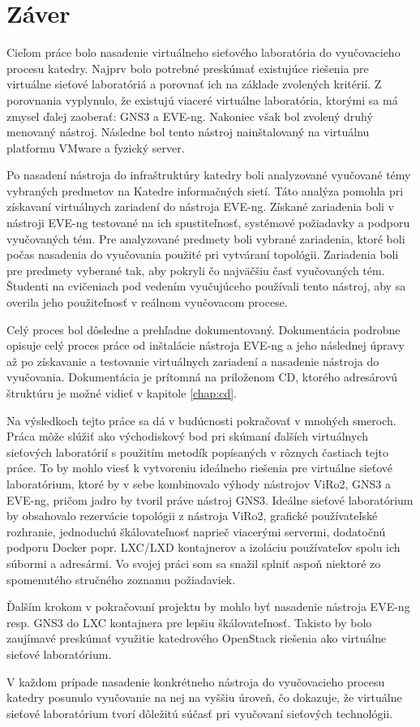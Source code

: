 \chapter{Záver}

Cieľom práce bolo nasadenie virtuálneho sieťového laboratória do vyučovacieho procesu katedry. Najprv bolo potrebné preskúmať existujúce riešenia pre virtuálne sieťové laboratóriá a porovnať ich na základe zvolených kritérií. Z porovnania vyplynulo, že existujú viaceré virtuálne laboratória, ktorými sa má zmysel ďalej zaoberať: GNS3 a EVE-ng. Nakoniec však bol zvolený druhý menovaný nástroj. Následne bol tento nástroj nainštalovaný na virtuálnu platformu VMware a fyzický server.

Po nasadení nástroja do infraštruktúry katedry boli analyzované vyučované témy vybraných predmetov na Katedre informačných sietí. Táto analýza pomohla pri získavaní virtuálnych zariadení do nástroja EVE-ng. Získané zariadenia boli v nástroji EVE-ng testované na ich spustiteľnosť, systémové požiadavky a podporu vyučovaných tém. Pre analyzované predmety boli vybrané zariadenia, ktoré boli počas nasadenia do vyučovania použité pri vytváraní topológii. Zariadenia boli pre predmety vyberané tak, aby pokryli čo najväčšiu časť vyučovaných tém. Študenti na cvičeniach pod vedením vyučujúceho používali tento nástroj, aby sa overila jeho použiteľnosť v reálnom vyučovacom procese.

Celý proces bol dôsledne a prehľadne dokumentovaný. Dokumentácia podrobne opisuje celý proces práce od inštalácie nástroja EVE-ng a jeho následnej úpravy až po získavanie a testovanie virtuálnych zariadení a nasadenie nástroja do vyučovania. Dokumentácia je prítomná na priloženom CD, ktorého adresárovú štruktúru je možné vidieť v kapitole \ref{chap:cd}.

Na výsledkoch tejto práce sa dá v budúcnosti pokračovať v mnohých smeroch. Práca môže slúžiť ako východiskový bod pri skúmaní ďalších virtuálnych sieťových laboratórií s použitím metodík popísaných v rôznych častiach tejto práce. To by mohlo viesť k vytvoreniu ideálneho riešenia pre virtuálne sieťové laboratórium, ktoré by v sebe kombinovalo výhody nástrojov ViRo2, GNS3 a EVE-ng, pričom jadro by tvoril práve nástroj GNS3. Ideálne sieťové laboratórium by obsahovalo rezervácie topológii z nástroja ViRo2, grafické používateľské rozhranie, jednoduchú škálovateľnosť naprieč viacerými servermi, dodatočnú podporu Docker popr. LXC/LXD kontajnerov a izoláciu používateľov spolu ich súbormi a adresármi. Vo svojej práci som sa snažil splniť aspoň niektoré zo spomenutého stručného zoznamu požiadaviek.

Ďalším krokom v pokračovaní projektu by mohlo byť nasadenie nástroja EVE-ng resp. GNS3 do LXC kontajnera pre lepšiu škálovateľnosť. Takisto by bolo zaujímavé preskúmať využitie katedrového OpenStack riešenia ako virtuálne sieťové laboratórium.

V každom prípade nasadenie konkrétneho nástroja do vyučovacieho procesu katedry posunulo vyučovanie na nej na vyššiu úroveň, čo dokazuje, že virtuálne sieťové laboratórium tvorí dôležitú súčasť pri vyučovaní sieťových technológii.